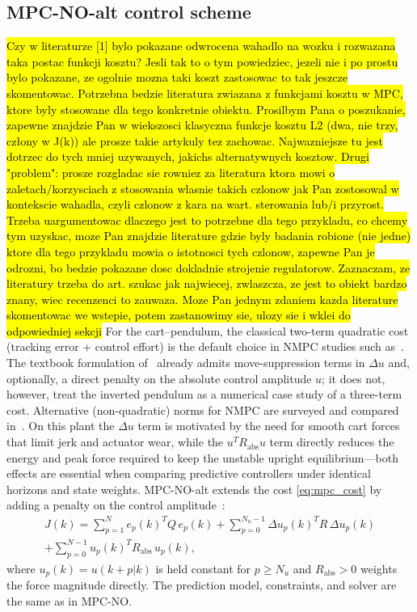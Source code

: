\documentclass[twocolumn]{svjour3}
\begin{document}
\subsection{MPC-NO-alt control scheme}
\hl{Czy w literaturze [1] bylo pokazane odwrocena wahadlo na wozku i rozwazana taka postac funkcji kosztu? Jesli tak to o tym powiedziec, jezeli nie i po prostu bylo pokazane, ze ogolnie mozna taki koszt zastosowac to tak jeszcze skomentowac. Potrzebna bedzie literatura zwiazana z funkcjami kosztu w MPC, ktore byly stosowane dla tego konkretnie obiektu. Prosilbym Pana o poszukanie, zapewne znajdzie Pan w wiekszosci klasyczna funkcje kosztu L2 (dwa, nie trzy, człony w J(k)) ale prosze takie artykuly tez zachowac. Najwazniejsze tu jest dotrzec do tych mniej uzywanych, jakichs alternatywnych kosztow. Drugi "problem": prosze rozgladac sie rowniez za literatura ktora mowi o zaletach/korzysciach z stosowania wlasnie takich czlonow jak Pan zostosowal w kontekscie wahadla, czyli czlonow z kara na wart. sterowania lub/i przyrost. Trzeba uargumentowac dlaczego jest to potrzebne dla tego przykladu, co chcemy tym uzyskac, moze Pan znajdzie literature gdzie byly badania robione (nie jedne) ktore dla tego przykladu mowia o istotnosci tych czlonow, zapewne Pan je odrozni, bo bedzie pokazane dosc dokladnie strojenie regulatorow. Zaznaczam, ze literatury trzeba do art. szukac jak najwiecej, zwlaszcza, ze jest to obiekt bardzo znany, wiec recenzenci to zauwaza. Moze Pan jednym zdaniem kazda literature skomentowac we wstepie, potem zastanowimy sie, ulozy sie i wklei do odpowiedniej sekcji}
For the cart--pendulum, the classical two-term quadratic cost (tracking error + control effort)
is the default choice in NMPC studies such as~\cite{Mills2009}. The textbook formulation
of~\cite{Camacho2026} already admits move-suppression terms in $\Delta u$ and, optionally, a direct
penalty on the absolute control amplitude $u$; it does not, however, treat the inverted pendulum
as a numerical case study of a three-term cost. Alternative (non-quadratic) norms for NMPC are
surveyed and compared in~\cite{Nebeluk2024}. On this plant the $\Delta u$ term is motivated by the
need for smooth cart forces that limit jerk and actuator wear, while the
$u^{\!T}R_\mathrm{abs}u$ term directly reduces the energy and peak force required to keep the
unstable upright equilibrium---both effects are essential when comparing predictive controllers
under identical horizons and state weights.
MPC-NO-alt extends the cost \eqref{eq:mpc_cost} by adding a penalty on the
control amplitude~\cite{Camacho2026,Muske1993,Rao1999}:
\begin{multline}
J(k) = \sum_{p=1}^{N}e_p(k)^T Q\,e_p(k)
+ \sum_{p=0}^{N_u-1}\Delta u_p(k)^T R\,\Delta u_p(k) \\
+ \sum_{p=0}^{N-1}u_p(k)^T R_\mathrm{abs}\,u_p(k),
\end{multline}
where $u_p(k)=u(k{+}p|k)$ is held constant for $p\geq N_u$ and $R_\mathrm{abs}>0$ weights the force
magnitude directly. The prediction model, constraints, and solver are the same as in MPC-NO.
\end{document}
